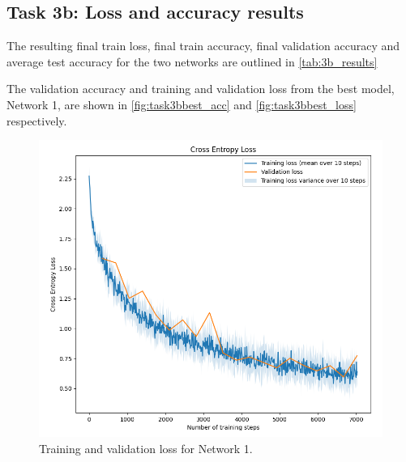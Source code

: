 \documentclass{article}
\begin{document}
\subsection{Task 3b: Loss and accuracy results}

The resulting final train loss, final train accuracy, final validation accuracy and average test accuracy for the two networks are outlined in \autoref{tab:3b_results}

\begin{table}[H]
\centering
\caption{Final train loss, final train accuracy, final validation accuracy and average test accuracy for the two networks.}
\label{tab:3b_results}
\end{table}

The validation accuracy and training and validation loss from the best model, Network 1, are shown in \autoref{fig:task3bbest_acc} and \autoref{fig:task3bbest_loss} respectively.  

\begin{figure}[H]
    \centering
    \includegraphics[width = \textwidth]{Assignments/Assignment_3/plots/task3best_plot_loss.png}
    \caption{Training and validation loss for Network 1.}
    \label{fig:task3bbest_loss}
\end{figure}
\end{document}
